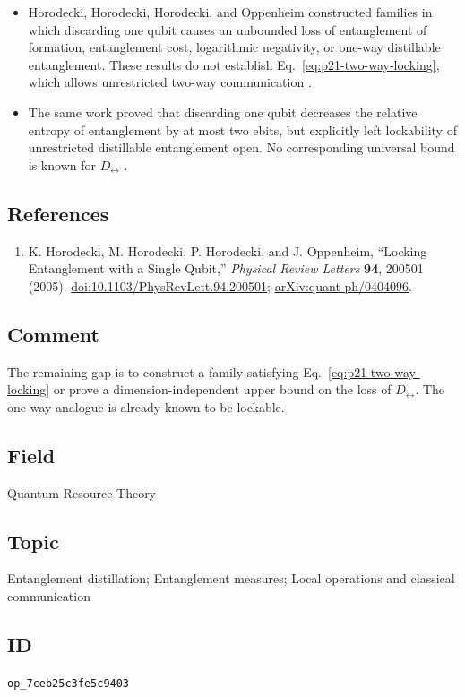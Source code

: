 \begin{itemize}
  \item Horodecki, Horodecki, Horodecki, and Oppenheim constructed families
  in which discarding one qubit causes an unbounded loss of entanglement of
  formation, entanglement cost, logarithmic negativity, or one-way
  distillable entanglement.  These results do not establish
  Eq.~\eqref{eq:p21-two-way-locking}, which allows unrestricted two-way
  communication .

  \item The same work proved that discarding one qubit decreases the relative
  entropy of entanglement by at most two ebits, but explicitly left
  lockability of unrestricted distillable entanglement open.  No corresponding
  universal bound is known for $D_{\leftrightarrow}$
  .
\end{itemize}

\subsection*{References}

\begin{enumerate}[label={},leftmargin=4.8em,labelsep=0.5em]
  \footnotesize
  \item[\textup{[HHHO05]}]\label{ref:p21-locking}
  K. Horodecki, M. Horodecki, P. Horodecki, and J. Oppenheim,
  ``Locking Entanglement with a Single Qubit,''
  \emph{Physical Review Letters} \textbf{94}, 200501 (2005).
  \href{https://doi.org/10.1103/PhysRevLett.94.200501}{doi:10.1103/PhysRevLett.94.200501};
  \href{https://arxiv.org/abs/quant-ph/0404096}{arXiv:quant-ph/0404096}.
\end{enumerate}

\subsection*{Comment}

The remaining gap is to construct a family satisfying
Eq.~\eqref{eq:p21-two-way-locking} or prove a dimension-independent upper
bound on the loss of $D_{\leftrightarrow}$.  The one-way analogue is already
known to be lockable.

\subsection*{Field}

Quantum Resource Theory

\subsection*{Topic}

Entanglement distillation; Entanglement measures; Local operations and classical communication

\subsection*{ID}

\texttt{op\_7ceb25c3fe5c9403}
